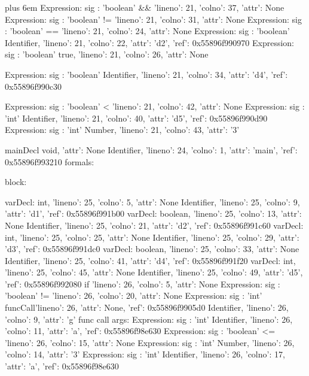 \documentclass{article}
\makeatletter
\newenvironment{myverb}
 {\def\@xobeysp{\ }\verbatim\rightskip=0pt plus 6em\relax}
 {\endverbatim}
\makeatother
\begin{document}
\begin{itemize}
\begin{myverb}
            Expression: {sig : 'boolean'}
              && {'lineno': 21, 'colno': 37, 'attr': None}
                Expression: {sig : 'boolean'}
                  != {'lineno': 21, 'colno': 31, 'attr': None}
                    Expression: {sig : 'boolean'}
                      == {'lineno': 21, 'colno': 24, 'attr': None}
                        Expression: {sig : 'boolean'}
                          Identifier, {'lineno': 21, 'colno': 22, 'attr': 'd2', 'ref': 0x55896f990970}
                        Expression: {sig : 'boolean'}
                          true, {'lineno': 21, 'colno': 26, 'attr': None}

                    Expression: {sig : 'boolean'}
                      Identifier, {'lineno': 21, 'colno': 34, 'attr': 'd4', 'ref': 0x55896f990c30}

                Expression: {sig : 'boolean'}
                  < {'lineno': 21, 'colno': 42, 'attr': None}
                    Expression: {sig : 'int'}
                      Identifier, {'lineno': 21, 'colno': 40, 'attr': 'd5', 'ref': 0x55896f990d90}
                    Expression: {sig : 'int'}
                      Number, {'lineno': 21, 'colno': 43, 'attr': '3'}




mainDecl
    void, {'attr': None}
    Identifier, {'lineno': 24, 'colno': 1, 'attr': 'main', 'ref': 0x55896f993210}
      formals:

    block:

      varDecl:
        int, {'lineno': 25, 'colno': 5, 'attr': None}
        Identifier, {'lineno': 25, 'colno': 9, 'attr': 'd1', 'ref': 0x55896f991b00}
      varDecl:
        boolean, {'lineno': 25, 'colno': 13, 'attr': None}
        Identifier, {'lineno': 25, 'colno': 21, 'attr': 'd2', 'ref': 0x55896f991c60}
      varDecl:
        int, {'lineno': 25, 'colno': 25, 'attr': None}
        Identifier, {'lineno': 25, 'colno': 29, 'attr': 'd3', 'ref': 0x55896f991dc0}
      varDecl:
        boolean, {'lineno': 25, 'colno': 33, 'attr': None}
        Identifier, {'lineno': 25, 'colno': 41, 'attr': 'd4', 'ref': 0x55896f991f20}
      varDecl:
        int, {'lineno': 25, 'colno': 45, 'attr': None}
        Identifier, {'lineno': 25, 'colno': 49, 'attr': 'd5', 'ref': 0x55896f992080}
      if {'lineno': 26, 'colno': 5, 'attr': None}
        Expression: {sig : 'boolean'}
          != {'lineno': 26, 'colno': 20, 'attr': None}
            Expression: {sig : 'int'}
              funcCall{'lineno': 26, 'attr': None, 'ref': 0x55896f9905d0}
                Identifier, {'lineno': 26, 'colno': 9, 'attr': 'g'}
                func call args:
                  Expression: {sig : 'int'}
                    Identifier, {'lineno': 26, 'colno': 11, 'attr': 'a', 'ref': 0x55896f98e630}
                  Expression: {sig : 'boolean'}
                    <= {'lineno': 26, 'colno': 15, 'attr': None}
                      Expression: {sig : 'int'}
                        Number, {'lineno': 26, 'colno': 14, 'attr': '3'}
                      Expression: {sig : 'int'}
                        Identifier, {'lineno': 26, 'colno': 17, 'attr': 'a', 'ref': 0x55896f98e630}



\end{myverb}
\end{itemize}
\end{document}
